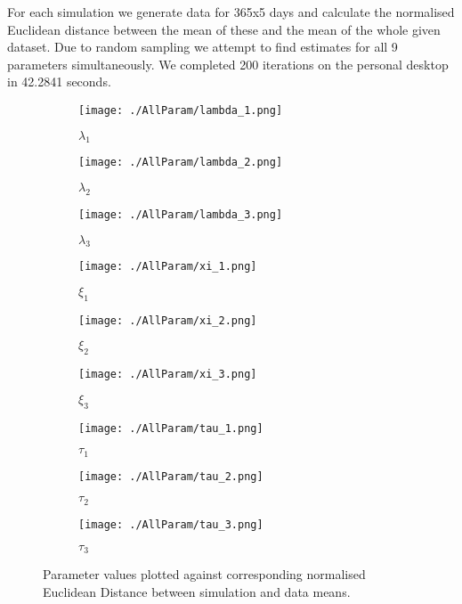 For each simulation we generate data for 365x5 days and calculate the normalised Euclidean distance between the mean of these and the mean of the whole given dataset. Due to random sampling we attempt to find estimates for all 9 parameters simultaneously. We completed 200 iterations on the personal desktop in 42.2841 seconds.

\begin{figure}
    \begin{subfigure}{.5\textwidth}
      \centering
      \texttt{[image: ./AllParam/lambda\_1.png]}
      \caption{$\lambda_1$ }
      \label{allp:lambda1}
    \end{subfigure}
    \begin{subfigure}{.5\textwidth}
      \centering
      \texttt{[image: ./AllParam/lambda\_2.png]}
      \caption{$\lambda_2$ }
      \label{allp:lambda2}
    \end{subfigure}
    \begin{subfigure}{.5\textwidth}
        \centering
        \texttt{[image: ./AllParam/lambda\_3.png]}
        \caption{$\lambda_3$ }
        \label{allp:lambda3}
    \end{subfigure}
    \begin{subfigure}{.5\textwidth} 
        \centering
        \texttt{[image: ./AllParam/xi\_1.png]}
        \caption{$\xi_1$ }
        \label{allp:xi1}
    \end{subfigure}
    \begin{subfigure}{.5\textwidth}
        \centering
        \texttt{[image: ./AllParam/xi\_2.png]}
        \caption{$\xi_2$ }
        \label{allp:xi2}
    \end{subfigure}
    \begin{subfigure}{.5\textwidth}
        \centering
        \texttt{[image: ./AllParam/xi\_3.png]}
        \caption{$\xi_3$ }
        \label{allp:xi3}
    \end{subfigure}
    \begin{subfigure}{.5\textwidth}
        \centering
        \texttt{[image: ./AllParam/tau\_1.png]}
        \caption{$\tau_1$ }
        \label{allp:tau1}
    \end{subfigure}
    \begin{subfigure}{.5\textwidth}  
        \centering
        \texttt{[image: ./AllParam/tau\_2.png]}
        \caption{$\tau_2$ }
        \label{allp:tau2}
    \end{subfigure}

    \centering
    \begin{subfigure}{.5\textwidth}
        \centering
        \texttt{[image: ./AllParam/tau\_3.png]}
        \caption{$\tau_3$ }
        \label{allp:tau3}
    \end{subfigure}

      \caption{Parameter values plotted against corresponding normalised Euclidean Distance between simulation and data means.}
      \label{allp}
\end{figure}
    
